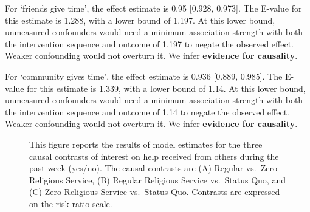 \documentclass[
  single column]{article}
\begin{document}
For `friends give time', the effect estimate is 0.95 {[}0.928, 0.973{]}.
The E-value for this estimate is 1.288, with a lower bound of 1.197. At
this lower bound, unmeasured confounders would need a minimum
association strength with both the intervention sequence and outcome of
1.197 to negate the observed effect. Weaker confounding would not
overturn it. We infer \textbf{evidence for causality}.

For `community gives time', the effect estimate is 0.936 {[}0.889,
0.985{]}. The E-value for this estimate is 1.339, with a lower bound of
1.14. At this lower bound, unmeasured confounders would need a minimum
association strength with both the intervention sequence and outcome of
1.14 to negate the observed effect. Weaker confounding would not
overturn it. We infer \textbf{evidence for causality}.

\begin{figure}


\caption{\label{fig-study2}This figure reports the results of model
estimates for the three causal contrasts of interest on help received
from others during the past week (yes/no). The causal contrasts are (A)
Regular vs.~Zero Religious Service, (B) Regular Religious Service
vs.~Status Quo, and (C) Zero Religious Service vs.~Status Quo. Contrasts
are expressed on the risk ratio scale.}

\end{figure}%
\end{document}
